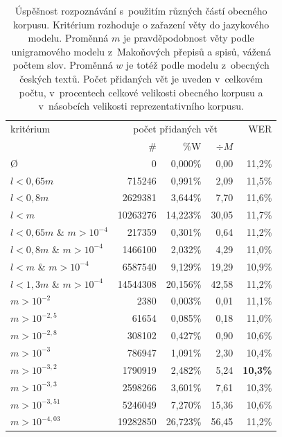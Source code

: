 \begin{table}[htpb]
\begin{center}
\begin{tabular}{|l|r r r|r|}
\hline
kritérium & \multicolumn{3}{c|}{počet přidaných vět} & WER \\
                        &       \# &  \%W       & $\div{}M$ & \\
\hline
Ø                       &        0 &  0,000\% &  0,00 & 11,2\% \\
$l<0,65m$               &   715246 &  0,991\% &  2,09 & 11,5\% \\
$l<0,8m$                &  2629381 &  3,644\% &  7,70 & 11,6\% \\
$l<m$                   & 10263276 & 14,223\% & 30,05 & 11,7\% \\
$l<0,65m$ \& $m>10^{-4}$&   217359 &  0,301\% &  0,64 & 11,2\% \\
$l<0,8m$ \& $m>10^{-4}$ &  1466100 &  2,032\% &  4,29 & 11,0\% \\
$l<m$ \& $m>10^{-4}$    &  6587540 &  9,129\% & 19,29 & 10,9\% \\
$l<1,3m$ \& $m>10^{-4}$ & 14544308 & 20,156\% & 42,58 & 11,2\% \\
$m>10^{-2}$             &     2380 &  0,003\% &  0,01 & 11,1\% \\
$m>10^{-2,5}$           &    61654 &  0,085\% &  0,18 & 11,0\% \\
$m>10^{-2,8}$           &   308102 &  0,427\% &  0,90 & 10,6\% \\
$m>10^{-3}$             &   786947 &  1,091\% &  2,30 & 10,4\% \\
$m>10^{-3,2}$           &  1790919 &  2,482\% &  5,24 & \textbf{10,3\%} \\
$m>10^{-3,3}$           &  2598266 &  3,601\% &  7,61 & 10,3\% \\
$m>10^{-3,51}$          &  5246049 &  7,270\% & 15,36 & 10,6\% \\
$m>10^{-4,03}$          & 19282850 & 26,723\% & 56,45 & 11,2\% \\
\hline
\end{tabular}
\caption{Úspěšnost rozpoznávání s~použitím různých částí obecného korpusu.
Kritérium rozhoduje o zařazení věty do jazykového modelu. Proměnná $m$ je
pravděpodobnost věty podle unigramového modelu z~Makoňových přepisů a spisů,
vážená počtem slov. Proměnná $w$ je totéž podle modelu z~obecných českých textů.
Počet přidaných vět je uveden v~celkovém počtu, v~procentech celkové velikosti
obecného korpusu a v~násobcích velikosti reprezentativního korpusu.}\label{tab:lm-plz-scores}
\end{center}
\end{table}

